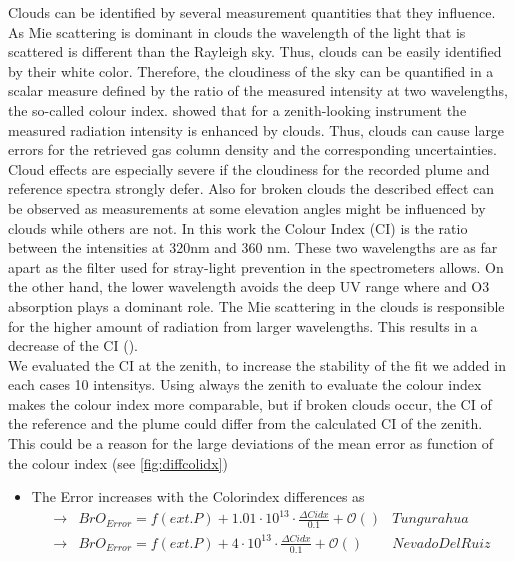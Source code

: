 \documentclass  [
  paper    = a4,
  BCOR     = 10mm,
  twoside,
  fontsize = 12pt,
  fleqn,
  toc      = bibnumbered,
  toc      = listofnumbered,
  numbers  = noendperiod,
  headings = normal,
  listof   = leveldown,
  version  = 3.03
]                                       {scrreprt}
\begin{document}
	Clouds can be identified by several measurement quantities that they influence.
	As Mie scattering is dominant in clouds the wavelength of the light that is scattered is different than the Rayleigh sky. Thus, clouds can be easily identified by their white color.
	Therefore, the cloudiness of the sky can be quantified in a scalar measure defined by the ratio of the measured intensity at two wavelengths, the so-called colour index.
	\cite{wagner2014cloud} showed that for a zenith-looking instrument the measured radiation intensity is enhanced by clouds. Thus, clouds can cause large errors for the retrieved gas column density and the corresponding uncertainties. 
	Cloud effects are especially severe if the cloudiness for the recorded plume and reference spectra strongly defer. Also for broken clouds the described effect can be observed as measurements at some elevation angles might be influenced by clouds while others are not.
	In this work the Colour Index (CI) is the ratio between the intensities at 320nm and 360 nm.
	These two wavelengths are as far apart as the filter used for stray-light prevention in the spectrometers allows.
	On the other hand, the lower wavelength avoids the deep UV range where  and O3 absorption plays a dominant role.
	The Mie scattering in the clouds is responsible for the higher amount of radiation from larger wavelengths. This results in a decrease of the CI (\cite{lubcke2014optical}).
	\\
	We evaluated the CI at the zenith, to increase the stability of the fit we added in each cases 10 intensitys. Using always the zenith to evaluate the colour index makes the colour index more comparable, but if broken clouds occur, the CI of the reference and the plume could differ from the calculated CI of the zenith. This could be a reason for the large deviations of the mean  error as function of the colour index (see \cref{fig:diffcolidx})

	\begin{itemize}
		\item 	The  Error increases with the Colorindex differences as \\
		\begin{align*}
		\rightarrow&  BrO_{Error} = f(ext. P)+ 1.01\cdot10^{13}\cdot\frac{\Delta Cidx}{0.1} + \mathcal{O}\left(\right) & Tungurahua\\
		\rightarrow&  BrO_{Error} = f(ext. P)+  4\cdot10^{13}\cdot\frac{\Delta Cidx}{0.1} + \mathcal{O}\left(\right) & Nevado Del Ruiz\\
		\end{align*}
	\end{itemize}
\end{document}
